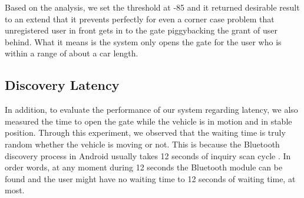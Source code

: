 Based on the analysis, we set the threshold at -85 and it returned desirable result to an extend that it prevents perfectly for even a corner case problem that unregistered user in front gets in to the gate piggybacking the grant of user behind. What it means is the system only opens the gate for the user who is within a range of about a car length.
\subsection{Discovery Latency}
In addition, to evaluate the performance of our system regarding latency, we also measured the time to open the gate while the vehicle is in motion and in stable position. Through this experiment, we observed that the waiting time is truly random whether the vehicle is moving or not. This is because the Bluetooth discovery process in Android usually takes 12 seconds of inquiry scan cycle \cite {btcycle}. In order words, at any moment during 12 seconds the Bluetooth module can be found and the user might have no waiting time to 12 seconds of waiting time, at most.